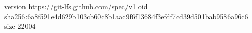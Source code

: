 version https://git-lfs.github.com/spec/v1
oid sha256:6a8f591e4d629b103cb60c8b1aac9f6f13684f3efdf7cd39d501bab9586a96c6
size 22004
